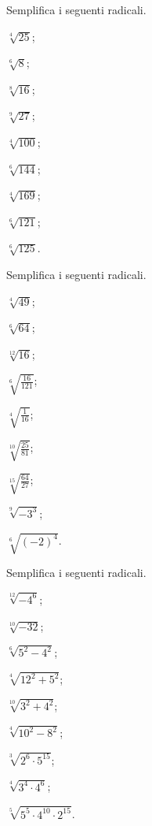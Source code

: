 \begin{esercizio}[\Ast]
\label{ese:2.25}
Semplifica i seguenti radicali.
 \begin{multicols}{3}
 \begin{enumeratea}
 \item $\sqrt[4]{25}$;
 \item $\sqrt[6]8$;
 \item $\sqrt[8]{16}$;
 \item $\sqrt[9]{27}$;
 \item $\sqrt[4]{100}$;
 \item $\sqrt[6]{144}$;
 \item $\sqrt[4]{169}$;
 \item $\sqrt[6]{121}$;
 \item $\sqrt[6]{125}$.
 \end{enumeratea}
 \end{multicols}
\end{esercizio}

\begin{esercizio}[\Ast]
 \label{ese:2.26}
Semplifica i seguenti radicali.
 \begin{multicols}{3}
 \begin{enumeratea}
 \item $\sqrt[4]{49}$;
 \item $\sqrt[6]{64}$;
 \item $\sqrt[12]{16}$;
 \item $\sqrt[6]{\frac{16}{121}}$;
 \item $\sqrt[4]{\frac 1{16}}$;
 \item $\sqrt[10]{\frac{25}{81}}$;
 \item $\sqrt[15]{\frac{64}{27}}$;
 \item $\sqrt[9]{-3^3}$;
 \item $\sqrt[6]{(-2)^4}$.
 \end{enumeratea}
 \end{multicols}
\end{esercizio}

\begin{esercizio}[\Ast]
 \label{ese:2.27}
Semplifica i seguenti radicali.
 \begin{multicols}{3}
 \begin{enumeratea}
 \item $\sqrt[12]{-4^6}$;
 \item $\sqrt[10]{-32}$;
 \item $\sqrt[6]{5^2-4^2}$;
 \item $\sqrt[4]{12^2+5^2}$;
 \item $\sqrt[10]{3^2+4^2}$;
 \item $\sqrt[4]{10^2-8^2}$;
 \item $\sqrt[3]{2^6\cdot 5^{15}}$;
 \item $\sqrt[4]{3^4\cdot 4^6}$;
 \item $\sqrt[5]{5^5\cdot 4^{10}\cdot 2^{15}}$.
 \end{enumeratea}
 \end{multicols}
\end{esercizio}

